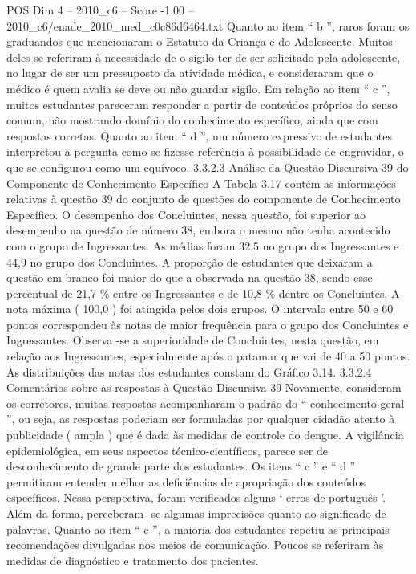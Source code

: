 \begin{textsample}{POS Dim 4 – 2010\_c6 – Score -1.00 – 2010\_c6/enade\_2010\_med\_c0c86d6464.txt}
Quanto ao item “ b ”, raros foram os graduandos que mencionaram o Estatuto da Criança e do Adolescente.
Muitos deles se referiram à necessidade de o sigilo ter de ser solicitado pela adolescente, no lugar de ser um pressuposto da atividade médica, e consideraram que o médico é quem avalia se deve ou não guardar sigilo.
Em relação ao item “ c ”, muitos estudantes pareceram responder a partir de conteúdos próprios do senso comum, não mostrando domínio do conhecimento específico, ainda que com respostas corretas.
Quanto ao item “ d ”, um número expressivo de estudantes interpretou a pergunta como se fizesse referência à possibilidade de engravidar, o que se configurou como um equívoco. 3.3.2.3 Análise da Questão Discursiva 39 do Componente de Conhecimento Específico A Tabela 3.17 contém as informações relativas à questão 39 do conjunto de questões do componente de Conhecimento Específico.
O desempenho dos Concluintes, nessa questão, foi superior ao desempenho na questão de número 38, embora o mesmo não tenha acontecido com o grupo de Ingressantes.
As médias foram 32,5 no grupo dos Ingressantes e 44,9 no grupo dos Concluintes.
A proporção de estudantes que deixaram a questão em branco foi maior do que a observada na questão 38, sendo esse percentual de 21,7 \% entre os Ingressantes e de 10,8 \% dentre os Concluintes.
A nota máxima ( 100,0 ) foi atingida pelos dois grupos.
O intervalo entre 50 e 60 pontos correspondeu às notas de maior frequência para o grupo dos Concluintes e Ingressantes.
Observa -se a superioridade de Concluintes, nesta questão, em relação aos Ingressantes, especialmente após o patamar que vai de 40 a 50 pontos.
As distribuições das notas dos estudantes constam do Gráfico 3.14. 3.3.2.4 Comentários sobre as respostas à Questão Discursiva 39 Novamente, consideram os corretores, muitas respostas acompanharam o padrão do “ conhecimento geral ”, ou seja, as respostas poderiam ser formuladas por qualquer cidadão atento à publicidade ( ampla ) que é dada às medidas de controle do dengue.
A vigilância epidemiológica, em seus aspectos técnico-científicos, parece ser de desconhecimento de grande parte dos estudantes.
Os itens “ c ” e “ d ” permitiram entender melhor as deficiências de apropriação dos conteúdos específicos.
Nessa perspectiva, foram verificados alguns ‘ erros de português ’.
Além da forma, perceberam -se algumas imprecisões quanto ao significado de palavras.
Quanto ao item “ c ”, a maioria dos estudantes repetiu as principais recomendações divulgadas nos meios de comunicação.
Poucos se referiram às medidas de diagnóstico e tratamento dos pacientes.

\end{textsample}
